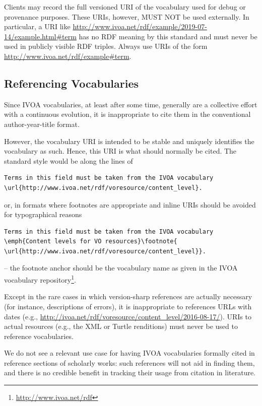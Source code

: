 \documentclass[11pt,a4paper]{ivoa}
\begin{document}
Clients may record the full versioned URI of the vocabulary used for
debug or provenance purposes.  These URIs, however, MUST NOT be used
externally.  In particular, a URI like
\url{http://www.ivoa.net/rdf/example/2019-07-14/example.html#term} has no
RDF meaning by this standard and must never be used in publicly visible
RDF triples.  Always use URIs of the form
\url{http://www.ivoa.net/rdf/example#term}.

\subsection{Referencing Vocabularies}

Since IVOA vocabularies, at least after some time, generally are a
collective effort with a continuous evolution, it is inappropriate to
cite them in the conventional author-year-title format.

However, the vocabulary URI is intended to be stable and uniquely
identifies the vocabulary as such.  Hence, this URI is what should
normally be cited.  The standard style would be along the lines of
\begin{lstlisting}[language={}]
Terms in this field must be taken from the IVOA vocabulary
\url{http://www.ivoa.net/rdf/voresource/content_level}.
\end{lstlisting}
or, in formats where footnotes are appropriate and inline URIs should be
avoided for typographical reasons
\begin{lstlisting}[language={}]
Terms in this field must be taken from the IVOA vocabulary
\emph{Content levels for VO resources}\footnote{
\url{http://www.ivoa.net/rdf/voresource/content_level}}.
\end{lstlisting}
-- the footnote anchor should be the vocabulary name as given in the
IVOA vocabulary repository\footnote{\url{http://www.ivoa.net/rdf}}.

Except in the rare cases in which version-sharp references are actually
necessary (for instance, descriptions of errors), it is inappropriate to
references URLs with dates (e.g.,
\url{http://ivoa.net/rdf/voresource/content_level/2016-08-17/}).  URIs
to actual resources (e.g., the XML or Turtle renditions) must never be
used to reference vocabularies.

We do not see a relevant use case for having IVOA vocabularies formally
cited in reference sections of scholarly works: such references will not
aid in finding them, and there is no credible benefit in tracking their
usage from citation in literature.
\end{document}
